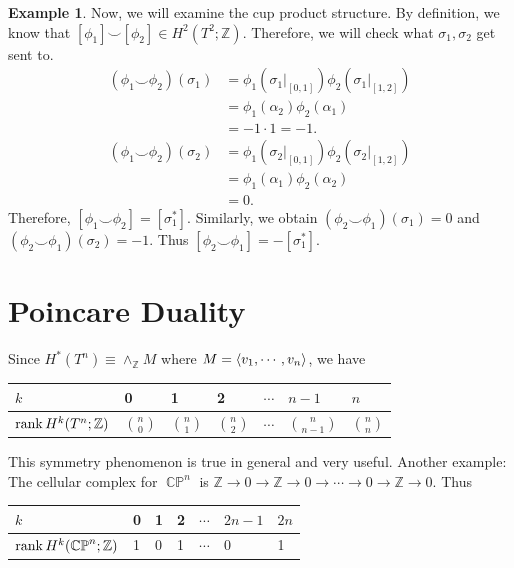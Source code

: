 \documentclass[psamsfonts]{amsart}
\theoremstyle{definition}
\newtheorem{exmp}[thm]{Example}
\theoremstyle{rem}
\DeclareMathOperator{\CP}{\mathbb{C}\mathbb{P}}
\numberwithin{equation}{section}
\begin{document}
\begin{exmp}
  Now, we will examine the cup product structure.
  By definition, we know that $[\phi_1] \smile [\phi_2] \in H^2(T^2; \mathbb{Z})$.
  Therefore, we will check what $\sigma_1, \sigma_2$ get sent to.
  \begin{align*}
    (\phi_1 \smile \phi_2)(\sigma_1)
      &= \phi_1(\sigma_1\vert_{[0, 1]})\phi_2(\sigma_1\vert_{[1, 2]}) \\
      &= \phi_1(\alpha_2)\phi_2(\alpha_1) \\
      &= -1 \cdot 1 = -1. \\
    (\phi_1 \smile \phi_2)(\sigma_2)
      &= \phi_1(\sigma_2\vert_{[0, 1]})\phi_2(\sigma_2\vert_{[1, 2]}) \\
      &= \phi_1(\alpha_1)\phi_2(\alpha_2) \\
      &= 0.
  \end{align*}
  Therefore, $[\phi_1 \smile \phi_2] = [\sigma_1^{\ast}]$.
  Similarly, we obtain $(\phi_2 \smile \phi_1)(\sigma_1) = 0$ and $(\phi_2 \smile \phi_1)(\sigma_2) = -1$.
  Thus $[\phi_2 \smile \phi_1] = -[\sigma_1^{\ast}]$.
\end{exmp}

\section{Poincare Duality}

Since $H^{\ast}(T^n) \equiv \wedge_{\mathbb{Z}} M$ where $M = \ev{ v_1, \cdots, v_n }$, we have

\begin{center}
  \begin{tabular}{| l | l | l | l | l | l | l |} \hline
    $k$                          & 0 & 1 & 2 & $\cdots$ & $n - 1$  & $n$ \\ \hline
    $\rank H^k(T^n; \mathbb{Z})$ & $\binom{n}{0}$ & $\binom{n}{1}$ & $\binom{n}{2}$ & $\cdots$ & $\binom{n}{n - 1}$ & $\binom{n}{n}$ \\ \hline
  \end{tabular}
\end{center}

This symmetry phenomenon is true in general and very useful.
Another example: The cellular complex for $\CP^n$ is $\mathbb{Z} \rightarrow 0 \rightarrow \mathbb{Z} \rightarrow 0 \rightarrow \cdots \rightarrow 0 \rightarrow \mathbb{Z} \rightarrow 0$.
Thus

\begin{center}
  \begin{tabular}{| l | l | l | l | l | l | l |} \hline
    $k$                          & 0 & 1 & 2 & $\cdots$ & $2n - 1$  & $2n$ \\ \hline
    $\rank H^k(\CP^n; \mathbb{Z})$ & 1 & 0 & 1 & $\cdots$ & 0         & 1 \\
    \hline
  \end{tabular}
\end{center}
\end{document}
